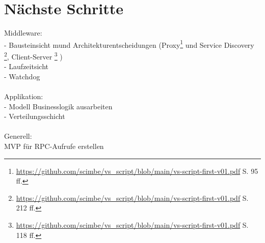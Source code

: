 \documentclass{article}
\begin{document}
 
\section{Nächste Schritte}
Middleware:\\
- Bausteinsicht mund Architekturentscheidungen (Proxy\footnote{\url{https://github.com/scimbe/vs_script/blob/main/vs-script-first-v01.pdf} S. 95 ff. } und Service Discovery \footnote{\url{https://github.com/scimbe/vs_script/blob/main/vs-script-first-v01.pdf} S. 212 ff. }, Client-Server \footnote{\url{https://github.com/scimbe/vs_script/blob/main/vs-script-first-v01.pdf} S. 118 ff. } )\\
- Laufzeitsicht \\
- Watchdog \\
\\
Applikation:\\
- Modell Businesslogik ausarbeiten\\
- Verteilungsschicht \\
\\
Generell:\\
MVP für RPC-Aufrufe erstellen
\end{document}

